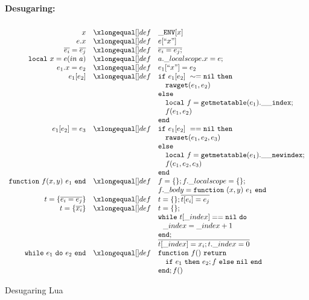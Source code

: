 \begin{figure}[P]
\caption{Desugaring Lua}
{\bf Desugaring:}
\label{fig:desLua}
\[
\begin{array}{rclcl}
\\

\desugar{x}{{\tt \_ENV}[x]}
\desugar{e.x}{e[``x"]}
\desugar{\overline{e_i}=\overline{e_j}}{\overline{e_i = e_j;}}
\desugar{{\tt local}~x=e(in~a)}{a.\_localscope.x = e;}
\desugar{e_1.x=e_2}{e_1[``x"] = e_2}
\desugar{e_1[e_2]}{{\tt if}~ e_1[e_2] ~\sim= {\tt nil} ~ {\tt then}\\}
\desugarline{ 
     \quad{\tt rawget}(e_1, e_2) ~\\
     {\tt else}\\
     \quad{\tt local}~f = {\tt getmetatable}(e_1).{\tt{\_}{\_}index};\\
     \quad f(e_1,e_2)\\ 
     {\tt end}\\
}
\desugar{e_1[e_2]=e_3}{
    {\tt if}~ e_1[e_2] ~== {\tt nil} ~ {\tt then}\\
}
\desugarline{  
     \quad{\tt rawset}(e_1, e_2,e_3) ~\\
     {\tt else}\\
     \quad{\tt local}~f = {\tt getmetatable}(e_1).{\tt{\_}{\_}newindex};\\
     \quad f(e_1,e_2,e_3)\\ 
     {\tt end}\\
 
}
\desugar{{\tt function}~f(x,y)~e_1~{\tt end}}{f = \{\}; f.\_localscope = \{\};}
\desugarline{f.\_body = {\tt function}~(x,y)~e_1~{\tt end}}
\desugar{t = \{\overline{e_i = e_j}\}}{t = \{\}; \overline{t[e_i]=e_j}}
\desugar{t = \{\overline{x_i}\}}{t = \{\};}
\desugarline{ {\tt while}~t[\_index] == {\tt nil~do}}
\desugarline{ ~~\_index = \_index + 1~ }
\desugarline{{\tt end};}
\desugarline{ \overline{t[\_index] = x_i; t.\_index = 0}}

\desugar{{\tt while}~e_1~{\tt do}~e_2~{\tt end}}{
    {\tt function}~f()~{\tt return}
}
\desugarline{ \quad{\tt if}~e_1~{\tt then}~e_2;f~{\tt else}~{\tt nil}~{\tt end}\\
{\tt end};f()
}
\end{array}\]
\end{figure}







